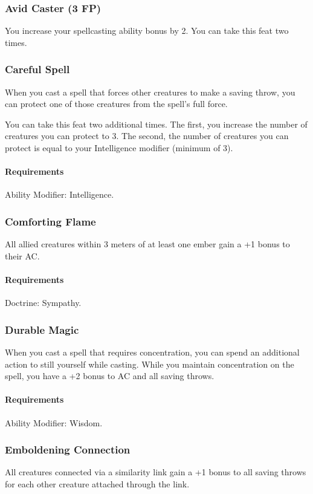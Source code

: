 \subsubsection{Avid Caster (3 FP)} \label{feat::avidcaster}
    You increase your spellcasting ability bonus by 2.
    You can take this feat two times.
\subsubsection{Careful Spell} \label{feat::carefulspell}
    When you cast a spell that forces other creatures to make a saving throw, you can protect one of those creatures from the spell's full force.

    You can take this feat two additional times.
    The first, you increase the number of creatures you can protect to 3.
    The second, the number of creatures you can protect is equal to your Intelligence modifier (minimum of 3).
    \paragraph{Requirements} Ability Modifier: Intelligence.
\subsubsection{Comforting Flame} \label{feat::comfortingflame}
    All allied creatures within 3 meters of at least one ember gain a +1 bonus to their AC.
    \paragraph{Requirements} Doctrine: Sympathy.
\subsubsection{Durable Magic} \label{feat::durablemagic}
    When you cast a spell that requires concentration, you can spend an additional action to still yourself while casting.
    While you maintain concentration on the spell, you have a +2 bonus to AC and all saving throws.
    \paragraph{Requirements} Ability Modifier: Wisdom.
\subsubsection{Emboldening Connection} \label{feat::emboldeningconnection}
    All creatures connected via a similarity link gain a +1 bonus to all saving throws for each other creature attached through the link.

